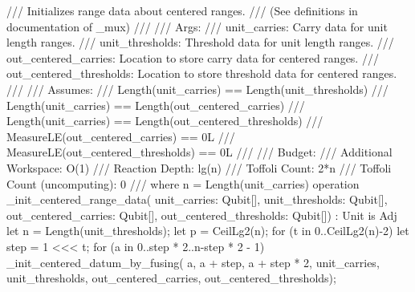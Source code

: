 \documentclass[onecolumn,unpublished]{quantumarticle}
\theoremstyle{definition}
\theoremstyle{definition}
\theoremstyle{definition}
\begin{document}
\begin{qsharp}
{    /// Initializes range data about centered ranges.
    /// (See definitions in documentation of _mux)
    ///
    /// Args:
    ///     unit_carries: Carry data for unit length ranges.
    ///     unit_thresholds: Threshold data for unit length ranges.
    ///     out_centered_carries: Location to store carry data for centered ranges.
    ///     out_centered_thresholds: Location to store threshold data for centered ranges.
    ///
    /// Assumes:
    ///     Length(unit_carries) == Length(unit_thresholds)
    ///     Length(unit_carries) == Length(out_centered_carries)
    ///     Length(unit_carries) == Length(out_centered_thresholds)
    ///     MeasureLE(out_centered_carries) == 0L
    ///     MeasureLE(out_centered_thresholds) == 0L
    ///
    /// Budget:
    ///     Additional Workspace: O(1)
    ///     Reaction Depth: lg(n)
    ///     Toffoli Count: 2*n
    ///     Toffoli Count (uncomputing): 0
    ///     where n = Length(unit_carries)
    operation _init_centered_range_data(
            unit_carries: Qubit[],
            unit_thresholds: Qubit[],
            out_centered_carries: Qubit[],
            out_centered_thresholds: Qubit[]) : Unit is Adj {
        let n = Length(unit_thresholds);
        let p = CeilLg2(n);
        for (t in 0..CeilLg2(n)-2) {
            let step = 1 <<< t;
            for (a in 0..step * 2..n-step * 2 - 1) {
                _init_centered_datum_by_fusing(
                    a,
                    a + step,
                    a + step * 2,
                    unit_carries,
                    unit_thresholds,
                    out_centered_carries,
                    out_centered_thresholds);
            }
        }
    }

}
\end{qsharp}
\end{document}
